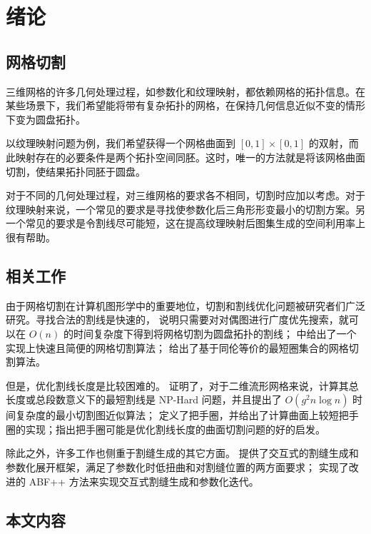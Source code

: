 
\chapter{绪论}

\section{网格切割}

三维网格的许多几何处理过程，如参数化和纹理映射，都依赖网格的拓扑信息。在某些场景下，我们希望能将带有复杂拓扑的网格，在保持几何信息近似不变的情形下变为圆盘拓扑。

以纹理映射问题为例，我们希望获得一个网格曲面到 $ [0, 1] \times [0, 1] $ 的双射，而此映射存在的必要条件是两个拓扑空间同胚。这时，唯一的方法就是将该网格曲面切割，使结果拓扑同胚于圆盘。

对于不同的几何处理过程，对三维网格的要求各不相同，切割时应加以考虑。对于纹理映射来说，一个常见的要求是寻找使参数化后三角形形变最小的切割方案\cite{Gu2002}。另一个常见的要求是令割线尽可能短，这在提高纹理映射后图集生成的空间利用率上很有帮助\cite{atlasgen}。

\section{相关工作}

由于网格切割在计算机图形学中的重要地位，切割和割线优化问题被研究者们广泛研究。寻找合法的割线是快速的，\citet{Dey1995} 说明只需要对对偶图进行广度优先搜索，就可以在 $ O(n) $ 的时间复杂度下得到将网格切割为圆盘拓扑的割线；\citet{Gu2002} 中给出了一个实现上快速且简便的网格切割算法；\citet{DeVerdiere2005} 给出了基于同伦等价的最短圈集合的网格切割算法。

但是，优化割线长度是比较困难的。\citet{Erickson2002} 证明了，对于二维流形网格来说，计算其总长度或总段数意义下的最短割线是 NP-Hard 问题，并且提出了 $ O(g^2 n \log n) $ 时间复杂度的最小切割图近似算法；\citet{oncomputinghantun} 定义了把手圈，并给出了计算曲面上较短把手圈的实现\cite{Dey2013}\cite{Dey2008}；\citet{Chai2018}指出把手圈可能是优化割线长度的曲面切割问题的好的启发。

除此之外，许多工作也侧重于割缝生成的其它方面。\citet{Poranne2017} 提供了交互式的割缝生成和参数化展开框架，满足了参数化时低扭曲和对割缝位置的两方面要求；\citet{wysiwyg} 实现了改进的 ABF++ 方法来实现交互式割缝生成和参数化迭代。

\section{本文内容}

